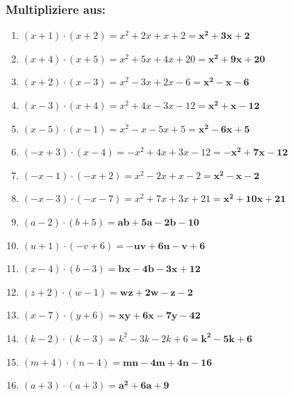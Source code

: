 \documentclass[a4paper,12pt]{article} %
\begin{document}
\subsubsection{Multipliziere aus:} %

\begin{enumerate}[label=\alph*)]

  \item \((x + 1) \cdot (x + 2) = x^2 + 2x + x + 2 = \mathbf{x^2 + 3x + 2}\) %

  \item \((x + 4) \cdot (x + 5) = x^2 + 5x + 4x + 20 = \mathbf{x^2 + 9x + 20}\) %

  \item \((x + 2) \cdot (x - 3) = x^2 - 3x + 2x - 6 = \mathbf{x^2 - x - 6}\) %

  \item \((x - 3) \cdot (x + 4) = x^2 + 4x - 3x - 12 = \mathbf{x^2 + x - 12}\) %

  \item \((x - 5) \cdot (x - 1) = x^2 - x - 5x + 5 = \mathbf{x^2 - 6x + 5}\) %

  \item \((-x + 3) \cdot (x - 4) = -x^2 + 4x + 3x - 12 = \mathbf{-x^2 + 7x - 12}\) %

  \item \((-x - 1) \cdot (-x + 2) = x^2 - 2x + x - 2 = \mathbf{x^2 - x - 2}\) %

  \item \((-x - 3) \cdot (-x - 7) = x^2 + 7x + 3x + 21 = \mathbf{x^2 + 10x + 21}\) %

  \item \((a - 2) \cdot (b + 5) = \mathbf{ab + 5a - 2b - 10}\) %

  \item \((u + 1) \cdot (-v + 6) = \mathbf{-uv + 6u - v + 6}\) %

  \item \((x - 4) \cdot (b - 3) = \mathbf{bx -4b - 3x + 12}\) %

  \item \((z + 2) \cdot (w - 1) = \mathbf{wz + 2w - z - 2}\) %

  \item \((x - 7) \cdot (y + 6) = \mathbf{xy + 6x - 7y - 42}\) %

  \item \((k - 2) \cdot (k - 3) = k^2 - 3k - 2k + 6 = \mathbf{k^2 - 5k + 6}\) %

  \item \((m + 4) \cdot (n - 4) = \mathbf{mn - 4m + 4n - 16}\) %

  \item \((a + 3) \cdot (a + 3) = \mathbf{a^2 + 6a + 9}\) %

\end{enumerate}
\end{document}
